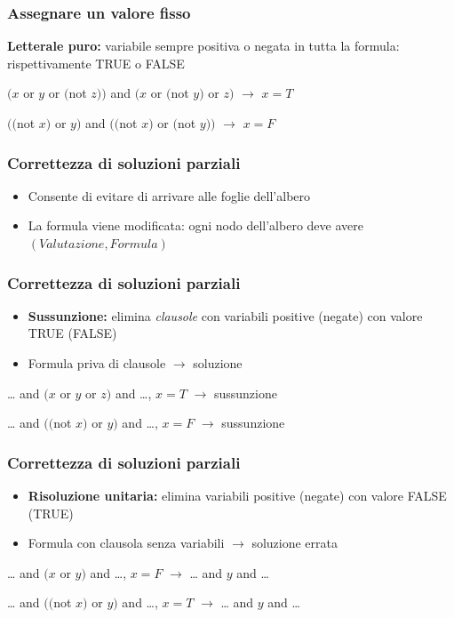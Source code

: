 \documentclass[12pt,xcolor=dvipsnames]{beamer}
\begin{document}
\begin{frame}
	\frametitle{Assegnare un valore fisso}
	\textbf{Letterale puro:} variabile sempre positiva o negata in tutta la formula: rispettivamente TRUE o FALSE \pause

    \begin{center}
        $(x$ or $y$ or $($not $z))$ and $(x$ or $($not $y)$ or $z)$ $\rightarrow$ $x = T$ \pause

        $(($not $x)$ or $y)$ and $(($not $x)$ or $($not $y))$ $\rightarrow$ $x = F$
    \end{center}
\end{frame}

\begin{frame}
	\frametitle{Correttezza di soluzioni parziali}
	\begin{itemize}
     \item Consente di evitare di arrivare alle foglie dell'albero \pause
	 \item La formula viene modificata: ogni nodo dell'albero deve avere $(Valutazione, Formula)$
	\end{itemize}
\end{frame}

\begin{frame}
	\frametitle{Correttezza di soluzioni parziali}
	\begin{itemize}
	 \item \textbf{Sussunzione:} elimina \textit{clausole} con variabili positive (negate) con valore TRUE (FALSE) \pause
     \item Formula priva di clausole $\rightarrow$ soluzione
	\end{itemize} \pause
    \begin{center}
        \ldots{} and $(x$ or $y$ or $z)$ and \ldots{}, $x = T$ $\rightarrow$ sussunzione \pause

        \ldots{} and $(($not $x)$ or $y)$ and \ldots{}, $x = F$ $\rightarrow$ sussunzione
    \end{center}
\end{frame}

\begin{frame}
	\frametitle{Correttezza di soluzioni parziali}
	\begin{itemize}
     \item \textbf{Risoluzione unitaria:} elimina {variabili} positive (negate) con valore FALSE (TRUE) \pause
     \item Formula con clausola senza variabili $\rightarrow$ soluzione errata
	\end{itemize} \pause
    \begin{center}
        \ldots{} and $(x$ or $y)$ and \ldots{}, $x = F$ $\rightarrow$ \ldots{} and $y$ and \ldots{} \pause

        \ldots{} and $(($not $x)$ or $y)$ and \ldots{}, $x = T$ $\rightarrow$ \ldots{} and $y$ and \ldots{}
    \end{center}
\end{frame}
\end{document}
